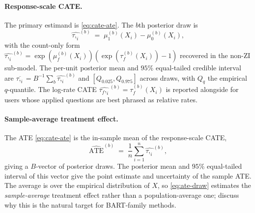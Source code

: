\documentclass[11pt]{article}
\theoremstyle{plain}
\theoremstyle{definition}
\theoremstyle{remark}
\newcommand{\muF}{\mu_f}
\newcommand{\tauF}{\tau_f}
\newcommand{\muone}{\mu_{1}}
\newcommand{\muzero}{\mu_{0}}
\newcommand{\tauresp}{\tau}                 %
\newcommand{\taulog}{\tau_{f}}              %
\begin{document}
\paragraph{Response-scale CATE.}
The primary estimand is \eqref{eq:cate-ate}. The $b$th posterior draw
is
\begin{equation}
  \widehat{\tauresp,_i}^{(b)}
  \;=\; \muone^{(b)}(X_i) - \muzero^{(b)}(X_i),
  \label{eq:zi-tauresp-draw}
\end{equation}
with the count-only form $\widehat{\tauresp,_i}^{(b)} =
\exp(\muF^{(b)}(X_i))(\exp(\tauF^{(b)}(X_i)) - 1)$ recovered in the
non-ZI sub-model. The per-unit posterior mean and $95\%$ equal-tailed
credible interval are
$\overline{\tauresp,_i} = B^{-1} \sum_b \widehat{\tauresp,_i}^{(b)}$
and $[Q_{0.025}, Q_{0.975}]$ across draws, with $Q_q$ the empirical
$q$-quantile. The log-rate CATE
$\widehat{\taulog,_i}^{(b)} = \tauF^{(b)}(X_i)$ is reported alongside
for users whose applied questions are best phrased as relative rates.

\paragraph{Sample-average treatment effect.}
The ATE \eqref{eq:cate-ate} is the in-sample mean of the
response-scale CATE,
\begin{equation}
  \widehat{\mathrm{ATE}}^{(b)}
  \;=\; \frac{1}{n} \sum_{i=1}^{n} \widehat{\tauresp,_i}^{(b)},
  \label{eq:ate-draw}
\end{equation}
giving a $B$-vector of posterior draws. The posterior mean and
$95\%$ equal-tailed interval of this vector give the point estimate
and uncertainty of the sample ATE. The average is over the empirical
distribution of $X$, so \eqref{eq:ate-draw} estimates the
\emph{sample-average} treatment effect rather than a
population-average one; \citet{hahn2020bayesian} discuss why this is
the natural target for BART-family methods.
\end{document}
